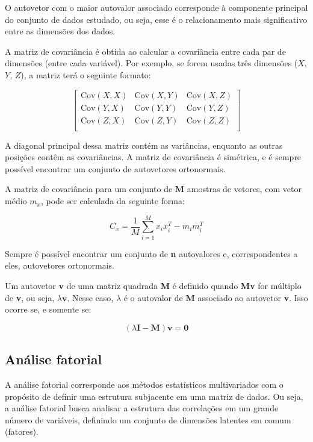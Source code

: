 \documentclass[
]{estat/estat}
\begin{document}
O autovetor com o maior autovalor associado corresponde à componente
principal do conjunto de dados estudado, ou seja, esse é o
relacionamento mais significativo entre as dimensões dos dados.

A matriz de covariância é obtida ao calcular a covariância entre cada
par de dimensões (entre cada variável). Por exemplo, se forem usadas
três dimensões (\(X\), \(Y\), \(Z\)), a matriz terá o seguinte formato:

\[
\begin{bmatrix}
    \text{Cov}(X,X) & \text{Cov}(X,Y) & \text{Cov}(X,Z) \\
    \text{Cov}(Y,X) & \text{Cov}(Y,Y) & \text{Cov}(Y,Z) \\
    \text{Cov}(Z,X) & \text{Cov}(Z,Y) & \text{Cov}(Z,Z) \\
\end{bmatrix}
\]

A diagonal principal dessa matriz contém as variâncias, enquanto as
outras posições contêm as covariâncias. A matriz de covariância é
simétrica, e é sempre possível encontrar um conjunto de autovetores
ortonormais.

A matriz de covariância para um conjunto de \textbf{M} amostras de
vetores, com vetor médio \(m_{x}\), pode ser calculada da seguinte
forma:

\[
C_{x} = \frac{1}{M} \sum_{i=1}^{M} x_{i} x_{i}^{T} - m_{i} m_{i}^{T}
\]

Sempre é possível encontrar um conjunto de \textbf{n} autovalores e,
correspondentes a eles, autovetores ortonormais.

Um autovetor \textbf{v} de uma matriz quadrada \textbf{M} é definido
quando \textbf{Mv} for múltiplo de \textbf{v}, ou seja,
\(\lambda \mathbf{v}\). Nesse caso, \(\lambda\) é o autovalor de
\textbf{M} associado ao autovetor \textbf{v}. Isso ocorre se, e somente
se:

\[
(\lambda \mathbf{I} - \mathbf{M})\mathbf{v} = \mathbf{0}
\]

\subsection{Análise fatorial}\label{anuxe1lise-fatorial}

A análise fatorial corresponde aos métodos estatísticos multivariados
com o propósito de definir uma estrutura subjacente em uma matriz de
dados. Ou seja, a análise fatorial busca analisar a estrutura das
correlações em um grande número de variáveis, definindo um conjunto de
dimensões latentes em comum (fatores).
\end{document}
